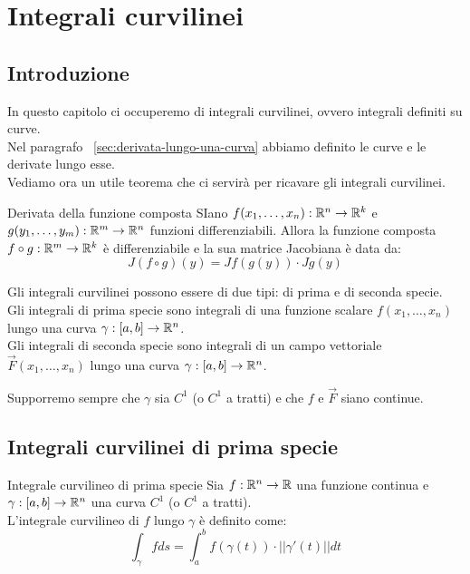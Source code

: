 \chapter{Integrali curvilinei}

\section{Introduzione}
In questo capitolo ci occuperemo di integrali curvilinei, ovvero integrali definiti su curve.\\
Nel paragrafo ~\ref{sec:derivata-lungo-una-curva} abbiamo definito le curve e le derivate lungo esse.\\
Vediamo ora un utile teorema che ci servirà per ricavare gli integrali curvilinei.

\begin{teorema}{Derivata della funzione composta}
  SIano $f(x_1, \dots, x_n): \mathbb{R}^n \rightarrow \mathbb{R}^k$ e $g(y_1, \dots, y_m): \mathbb{R}^m \rightarrow \mathbb{R}^n$ funzioni differenziabili. Allora la funzione composta $f \circ g: \mathbb{R}^m \rightarrow \mathbb{R}^k$ è differenziabile e la sua matrice Jacobiana è data da:
  $$J(f \circ g)(y) = Jf(g(y)) \cdot Jg(y)$$
\end{teorema}

Gli integrali curvilinei possono essere di due tipi: di prima e di seconda specie.\\
Gli integrali di prima specie sono integrali di una funzione scalare $f(x_1, \dots, x_n)$ lungo una curva $\gamma: [a, b] \rightarrow \mathbb{R}^n$.\\
Gli integrali di seconda specie sono integrali di un campo vettoriale $\vec F(x_1, \dots, x_n)$ lungo una curva $\gamma: [a, b] \rightarrow \mathbb{R}^n$.\\

\begin{osservazione}{}
  Supporremo sempre che $\gamma$ sia $C^1$ (o $C^1$ a tratti) e che $f$ e $\vec F$ siano continue.
\end{osservazione}

\section{Integrali curvilinei di prima specie}
\begin{definizione}{Integrale curvilineo di prima specie}
  Sia $f: \mathbb{R}^n \rightarrow \mathbb{R}$ una funzione continua e $\gamma: [a, b] \rightarrow \mathbb{R}^n$ una curva $C^1$ (o $C^1$ a tratti).\\
  L'integrale curvilineo di $f$ lungo $\gamma$ è definito come:
  $$\int_\gamma f ds = \int_a^b f(\gamma(t)) \cdot ||\gamma'(t)|| dt$$
\end{definizione}

